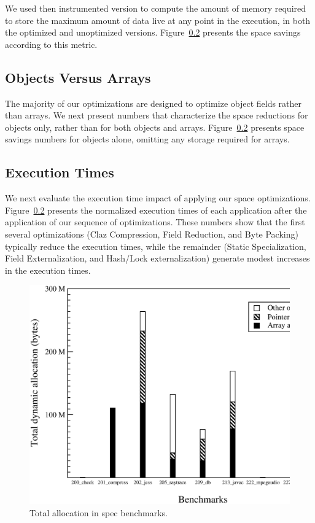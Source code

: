 \documentclass{acmconf}
\begin{document}
We used then instrumented version to compute the amount of memory required
to store the maximum amount of data live at any point in the
execution, in both the optimized and unoptimized versions. 
Figure~\ref{} presents the space savings according to this
metric. 

\subsection{Objects Versus Arrays}

The majority of our optimizations are designed to optimize
object fields rather than arrays. We next present numbers 
that characterize the space reductions for objects only,
rather than for both objects and arrays. Figure~\ref{}
presents space savings numbers for objects alone, omitting
any storage required for arrays. 

\subsection{Execution Times} 

We next evaluate the execution time impact of applying our space
optimizations. Figure~\ref{} presents the normalized execution 
times of each application after the application of our sequence
of optimizations. These numbers show that the first several
optimizations (Claz Compression, Field Reduction, and Byte Packing)
typically reduce the execution times, while the
remainder (Static Specialization, Field Externalization, and  Hash/Lock
externalization) generate modest increases in the execution times. 

\begin{figure}
\includegraphics[scale=0.32,clip=true]{Figures/spec-space.eps}
\caption{Total allocation in spec benchmarks.}
\label{fig:space}
\end{figure}
\end{document}
